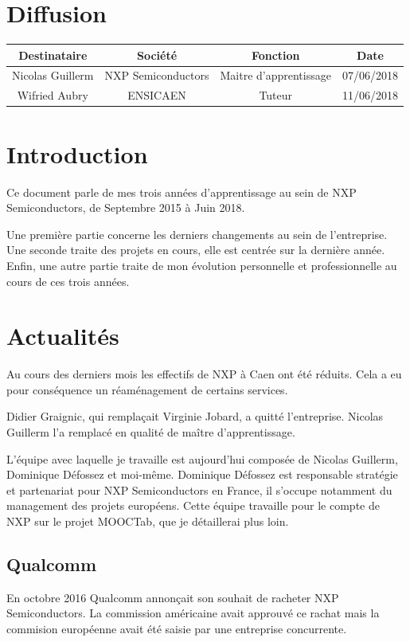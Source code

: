 \documentclass[french,12pt,a4paper,titlepage,openright,openbib]{report}
\begin{document}
{\let \clearpage \relax \chapter*{Diffusion}}
\begin{table}[ht]
	\label{tab:diffusion}
	\centering
	\begin{tabular}{|c|c|c|c|}
		\hline
		{\bf Destinataire} & {\bf Société}      & {\bf Fonction}   		 & {\bf Date}\\
		\hline
		Nicolas Guillerm   & NXP Semiconductors & Maitre d'apprentissage & 07/06/2018 \\
		\hline
		Wifried Aubry      & ENSICAEN 			& Tuteur				 & 11/06/2018 \\
		\hline
	\end{tabular}
\end{table}

\chapter{Introduction}
Ce document parle de mes trois années d'apprentissage au sein de NXP Semiconductors, de Septembre 2015 à Juin 2018.

Une première partie concerne les derniers changements au sein de l'entreprise.
Une seconde traite des projets en cours, elle est centrée sur la dernière année.
Enfin, une autre partie traite de mon évolution personnelle et professionnelle au cours de ces trois années.

\chapter{Actualités}
Au cours des derniers mois les effectifs de NXP à Caen ont été réduits. Cela a eu pour conséquence un réaménagement de certains services.

Didier Graignic, qui remplaçait Virginie Jobard, a quitté l'entreprise. Nicolas Guillerm l'a remplacé en qualité de maître d'apprentissage.

L'équipe avec laquelle je travaille est aujourd'hui composée de Nicolas Guillerm, Dominique Défossez et moi-même. Dominique Défossez est responsable stratégie et partenariat pour NXP Semiconductors en France, il s'occupe notamment du management des projets européens.
Cette équipe travaille pour le compte de NXP sur le projet MOOCTab, que je détaillerai plus loin.
\section{Qualcomm}
En octobre 2016 Qualcomm annonçait son souhait de racheter NXP Semiconductors. La commission américaine avait approuvé ce rachat mais la commision européenne avait été saisie par une entreprise concurrente.
\end{document}

